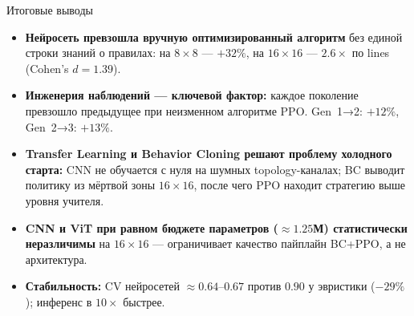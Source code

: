 \documentclass[aspectratio=169]{beamer}
\begin{document}
	\begin{frame}{Итоговые выводы}
		\begin{itemize}
			\item \textbf{Нейросеть превзошла вручную оптимизированный алгоритм} без единой строки знаний о правилах: на $8\times8$ — $+32\%$, на $16\times16$ — \textbf{$2.6\times$} по lines (Cohen's $d=1.39$).

			\item \textbf{Инженерия наблюдений — ключевой фактор:} каждое поколение превзошло предыдущее при неизменном алгоритме PPO. Gen~1→2: $+12\%$, Gen~2→3: $+13\%$.

			\item \textbf{Transfer Learning и Behavior Cloning решают проблему холодного старта:} CNN не обучается с нуля на шумных topology-каналах; BC выводит политику из мёртвой зоны $16\times16$, после чего PPO находит стратегию выше уровня учителя.

			\item \textbf{CNN и ViT при равном бюджете параметров ($\approx1.25$М) статистически неразличимы} на $16\times16$ — ограничивает качество пайплайн BC+PPO, а не архитектура.

			\item \textbf{Стабильность:} CV нейросетей $\approx0.64$--$0.67$ против $0.90$ у эвристики ($-29\%$); инференс в $10\times$ быстрее.
		\end{itemize}
	\end{frame}
\end{document}
